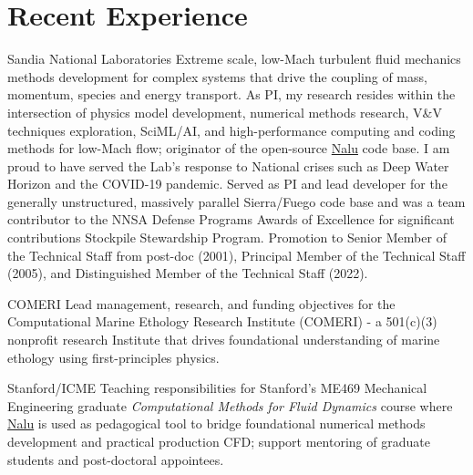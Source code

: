 \documentclass[letterpaper]{twentysecondcv_spd} %
\begin{document}
\section{Recent Experience}

\begin{twenty}

	 {Sandia National Laboratories} {Extreme scale, low-Mach turbulent fluid mechanics methods development for complex systems that drive the coupling of mass, momentum, species and energy transport. As PI, my research resides within the intersection of physics model development, numerical methods research, V\&V techniques exploration, SciML/AI, and high-performance computing and coding methods for low-Mach flow; originator of the open-source \href{https://github.com/NaluCFD}{Nalu} code base. I am proud to have served the Lab's response to National crises such as Deep Water Horizon and the COVID-19 pandemic. Served as PI and lead developer for the generally unstructured, massively parallel Sierra/Fuego code base and was a team contributor to the NNSA Defense Programs Awards of Excellence for significant contributions Stockpile Stewardship Program. Promotion to Senior Member of the Technical Staff from post-doc (2001), Principal Member of the Technical Staff (2005), and Distinguished Member of the Technical Staff (2022).}
	
	 {COMERI} {Lead management, research, and funding objectives for the Computational Marine Ethology Research Institute (COMERI) - a 501(c)(3) nonprofit research Institute that drives foundational understanding of marine ethology using first-principles physics.}
	
	 {Stanford/ICME} {Teaching responsibilities for Stanford's ME469 Mechanical Engineering graduate  \textit{Computational Methods for Fluid Dynamics} course where \href{https://github.com/NaluCFD}{Nalu} is used as pedagogical tool to bridge foundational numerical methods development and practical production CFD; support mentoring of graduate students and post-doctoral appointees.}
	
\end{twenty}

\end{document}
